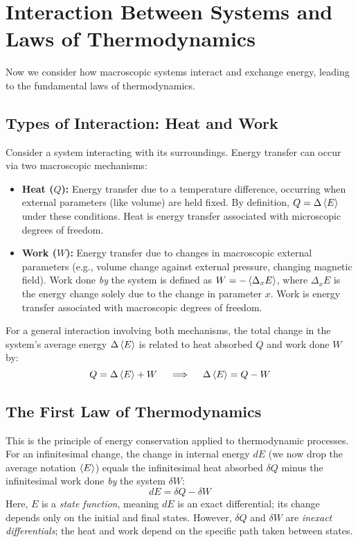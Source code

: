 \documentclass[10pt, letterpaper]{article}
\newcommand{\avg}[1]{\expval{#1}} %
\begin{document}
\section{Interaction Between Systems and Laws of Thermodynamics}
Now we consider how macroscopic systems interact and exchange energy, leading to the fundamental laws of thermodynamics.

\subsection{Types of Interaction: Heat and Work}
Consider a system interacting with its surroundings. Energy transfer can occur via two macroscopic mechanisms:
\begin{itemize}
    \item \textbf{Heat ($Q$):} Energy transfer due to a temperature difference, occurring when external parameters (like volume) are held fixed. By definition, $Q = \Delta \avg{E}$ under these conditions. Heat is energy transfer associated with microscopic degrees of freedom.
    \item \textbf{Work ($W$):} Energy transfer due to changes in macroscopic external parameters (e.g., volume change against external pressure, changing magnetic field). Work done \textit{by} the system is defined as $W = -\avg{\Delta_x E}$, where $\Delta_x E$ is the energy change solely due to the change in parameter $x$. Work is energy transfer associated with macroscopic degrees of freedom.
\end{itemize}
For a general interaction involving both mechanisms, the total change in the system's average energy $\Delta \avg{E}$ is related to heat absorbed $Q$ and work done $W$ by:
\begin{equation*}
    Q = \Delta \avg{E} + W \quad \implies \quad \Delta \avg{E} = Q - W
\end{equation*}

\subsection{The First Law of Thermodynamics}
This is the principle of energy conservation applied to thermodynamic processes. For an infinitesimal change, the change in internal energy $dE$ (we now drop the average notation $\avg{E}$) equals the infinitesimal heat absorbed $\delta Q$ minus the infinitesimal work done \textit{by} the system $\delta W$:
\begin{equation}
    dE = \delta Q - \delta W
\end{equation}
Here, $E$ is a \textit{state function}, meaning $dE$ is an exact differential; its change depends only on the initial and final states. However, $\delta Q$ and $\delta W$ are \textit{inexact differentials}; the heat and work depend on the specific path taken between states.
\end{document}
